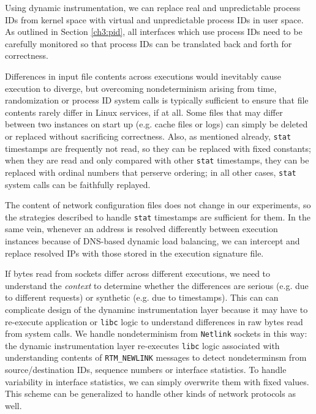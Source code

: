 Using dynamic instrumentation, we can replace
real and unpredictable process IDs from kernel space
with virtual and unpredictable process IDs in user space.
As outlined in Section \ref{ch3:pid}, all interfaces
which use process IDs need to be carefully monitored
so that process IDs can be translated back and forth
for correctness. \newline

 \newline
Differences in input file contents across
executions would inevitably cause execution
to diverge, but overcoming nondeterminism arising
from time, randomization or process ID system calls
is typically sufficient to ensure that
file contents rarely differ in Linux services,
if at all. Some files that may differ
between two instances on start up (e.g. 
cache files or logs) can simply be 
deleted or replaced without sacrificing correctness.
Also, as mentioned already, \texttt{stat} 
timestamps are frequently not read, so
they can be replaced with fixed constants;
when they are read and only compared with other
\texttt{stat} timestamps, they can be replaced with 
ordinal numbers that perserve ordering;  
in all other cases, \texttt{stat} system calls 
can be faithfully replayed. \newline

 \newline
The content of network configuration files
does not change in our experiments, so the strategies 
described to handle \texttt{stat} timestamps 
are sufficient for them. In the same vein, whenever an address is resolved
differently between execution instances because of DNS-based dynamic load balancing, 
we can intercept and replace resolved IPs with those
stored in the execution signature file.

If bytes read from sockets differ across different executions,
we need to understand the {\em context} to determine whether the
differences are serious (e.g. due to different requests)
or synthetic (e.g. due to timestamps). This can
can complicate design of the dynaminc instrumentation
layer because it 
may have to re-execute application or \texttt{libc}
logic to understand differences in raw bytes read from system calls.
We handle nondeterminism from \texttt{Netlink}
sockets in this way: the dynamic instrumentation layer 
re-executes \texttt{libc} logic associated
with understanding contents of \texttt{RTM\_NEWLINK}
messages to detect nondeterminsm from source/destination 
IDs, sequence numbers or interface statistics.
To handle variability in interface statistics,
we can simply overwrite them with fixed values.
This scheme can be generalized to handle
other kinds of network protocols as well.

